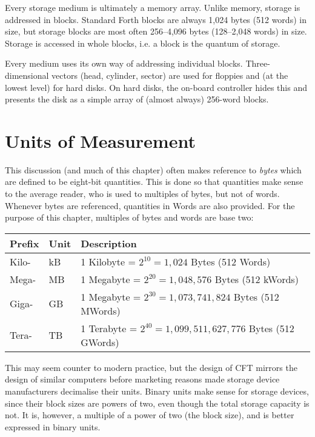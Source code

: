 Every storage medium is ultimately a memory array. Unlike memory, storage is
addressed in blocks. Standard Forth blocks are always 1,024 bytes (512 words)
in size, but storage blocks are most often 256–4,096 bytes (128–2,048 words) in
size. Storage is accessed in whole blocks, i.e. a block is the quantum of
storage. 

Every medium uses its own way of addressing individual
blocks. Three-dimensional vectors (head, cylinder, sector) are used for
floppies and (at the lowest level) for hard disks. On hard disks, the on-board
controller hides this and presents the disk as a simple array of (almost
always) 256-word blocks.

\section{Units of Measurement}

This discussion (and much of this chapter) often makes reference to
{\em bytes\/} which are defined to be eight-bit quantities. This is
done so that quantities make sense to the average reader, who is used
to multiples of bytes, but not of words. Whenever bytes are
referenced, quantities in Words are also provided. For the purpose of
this chapter, multiples of bytes and words are base two:

\begin{center}
  \zebra
  \begin{tabular}{lll}
    Prefix & Unit    & Description\\\hline
    Kilo-  & kB      & 1 Kilobyte = $2^{10}=1,024$ Bytes (512 Words) \\
    Mega-  & MB      & 1 Megabyte = $2^{20}=1,048,576$ Bytes (512 kWords) \\
    Giga-  & GB      & 1 Megabyte = $2^{30}=1,073,741,824$ Bytes (512 MWords) \\
    Tera-  & TB      & 1 Terabyte = $2^{40}=1,099,511,627,776$ Bytes (512 GWords) \\
    \hline
  \end{tabular}
\end{center}%
%
\noindent This may seem counter to modern practice, but the design of
CFT mirrors the design of similar computers before marketing reasons
made storage device manufacturers decimalise their units. Binary units
make sense for storage devices, since their block sizes are powers of
two, even though the total storage capacity is not. It is, however, a
multiple of a power of two (the block size), and is better expressed
in binary units.

